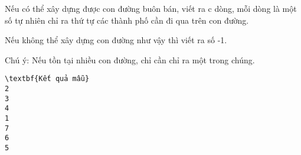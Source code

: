 Nếu có thể xây dựng được con đường buôn bán, viết ra c dòng, mỗi dòng là một số tự nhiên chỉ ra thứ tự các thành phố cần đi qua trên con đường.  

   Nếu không thể xây dựng con đường như vậy thì viết ra số -1.  

   Chú ý: Nếu tồn tại nhiều con đường, chỉ cần chỉ ra một trong chúng.  
\begin{verbatim}
\textbf{Kết quả mẫu}
2
3
4
1
7
6
5
\end{verbatim}